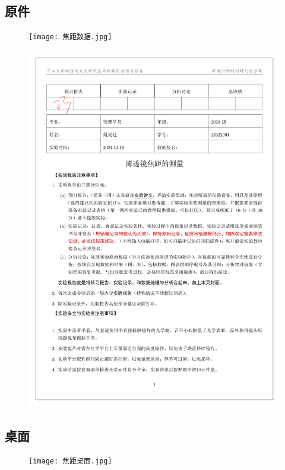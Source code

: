 \documentclass[dvipsnames, svgnames,a4paper,11pt]{article}
\begin{document}
\subsection*{原件}
%
\begin{figure}[H]
	\centering
	\texttt{[image: 焦距数据.jpg]}
	
\end{figure}
\begin{figure}[H]
	\centering
	\includegraphics[width=\textwidth]{透镜焦距.jpg}
	
\end{figure}

\subsection*{桌面}
\begin{figure}[H]
	\texttt{[image: 焦距桌面.jpg]}
\end{figure}
\end{document}
